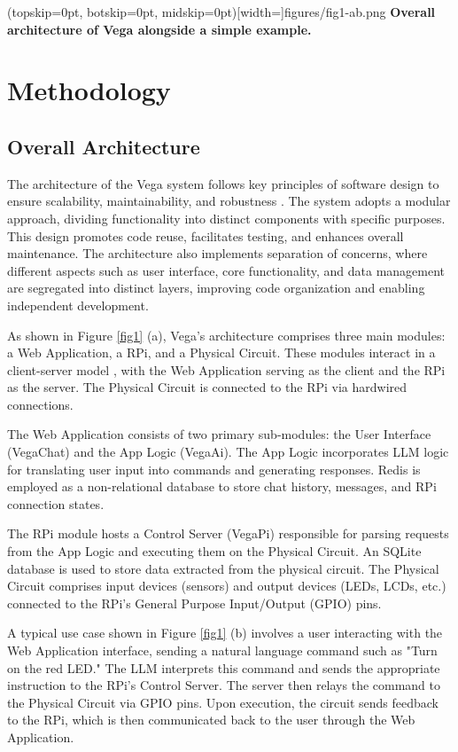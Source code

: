 \documentclass{ieeeaccess}
\begin{document}
\Figure[t!](topskip=0pt, botskip=0pt, midskip=0pt)[width=\textwidth]{{figures/fig1-ab.png}}
{ \textbf{Overall architecture of Vega alongside a simple example.}\label{fig1}}
\section{Methodology}
\label{sec:methodology}
\subsection{Overall Architecture}


The architecture of the Vega system follows key principles of software design to ensure scalability, maintainability, and robustness \cite{taylor2010software}. The system adopts a modular approach, dividing functionality into distinct components with specific purposes. This design promotes code reuse, facilitates testing, and enhances overall maintenance. The architecture also implements separation of concerns, where different aspects such as user interface, core functionality, and data management are segregated into distinct layers, improving code organization and enabling independent development.

As shown in Figure \ref{fig1} (a), Vega's architecture comprises three main modules: a Web Application, a RPi, and a Physical Circuit. These modules interact in a client-server model \cite{tanenbaum2002distributed}, with the Web Application serving as the client and the RPi as the server. The Physical Circuit is connected to the RPi via hardwired connections.

The Web Application consists of two primary sub-modules: the User Interface (VegaChat) and the App Logic (VegaAi). The App Logic incorporates LLM logic for translating user input into commands and generating responses. Redis \cite{6106531} is employed as a non-relational database to store chat history, messages, and RPi connection states.

The RPi module hosts a Control Server (VegaPi) responsible for parsing requests from the App Logic and executing them on the Physical Circuit. An SQLite database \cite{sqlite, sqliteapplication} is used to store data extracted from the physical circuit. The Physical Circuit comprises input devices (sensors) and output devices (LEDs, LCDs, etc.) connected to the RPi's General Purpose Input/Output (GPIO) pins.

A typical use case shown in Figure  \ref{fig1} (b) involves a user interacting with the Web Application interface, sending a natural language command such as "Turn on the red LED." The LLM interprets this command and sends the appropriate instruction to the RPi's Control Server. The server then relays the command to the Physical Circuit via GPIO pins. Upon execution, the circuit sends feedback to the RPi, which is then communicated back to the user through the Web Application.
\end{document}
